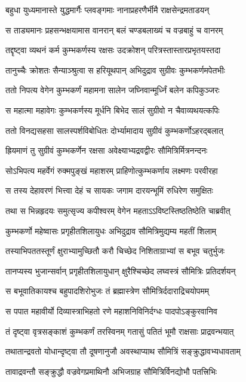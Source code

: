\twolineshloka
{बहुधा युध्यमानास्ते युद्धमार्गैः प्लवङ्गमाः}
{नानाप्रहरणैर्भीमै राक्षसेन्द्रमताडयन्}


\twolineshloka
{स ताड्यमानः प्रहसन्भक्षयामास वानरान्}
{बलं चण्डबलाख्यं च वज्रबाहुं च वानरम्}


\twolineshloka
{तद्दृष्ट्वा व्यथनं कर्म कुम्भकर्णस्य रक्षसः}
{उदक्रोशन् परित्रस्तास्तारप्रभृतयस्तदा}


\twolineshloka
{तानुच्चैः क्रोशतः सैन्याञ्श्रुत्वा स हरियूथपान्}
{अभिदुद्राव सुग्रीवः कुम्भकर्णमपेतभीः}


\twolineshloka
{ततो निपत्य वेगेन कुम्भकर्णं महामना}
{सालेन जघ्निवान्मूर्ध्निं बलेन कपिकुञ्जरः}


\twolineshloka
{स महात्मा महावेगः कुम्भकर्णस्य मूर्धनि}
{बिभेद सालं सुग्रीवो न चैवाव्यथयत्कपिः}


\twolineshloka
{ततो विनद्यसहसा सालस्पर्शविबोधितः}
{दोर्भ्यामादाय सुग्रीवं कुम्भकर्णोऽहरद्बलात्}


\twolineshloka
{ह्रियमाणं तु सुग्रीवं कुम्भकर्णेन रक्षसा}
{अवेक्ष्याभ्यद्रवद्वीरः सौमित्रिर्मित्रनन्दनः}


\twolineshloka
{सोऽभिपत्य महर्वेगं रुक्मपुङ्खं महाशरम्}
{प्राहिणोत्कुम्भकर्णाय लक्ष्मणः परवीरहा}


\twolineshloka
{स तस्य देहावरणं भित्त्वा देहं च सायकः}
{जगाम दारयन्भूमिं रुधिरेण समुक्षितः}


\twolineshloka
{तथा स भिन्नहृदयः समुत्सृज्य कपीश्वरम्}
{वेगेन महताऽऽविष्टस्तिष्ठतिष्ठेति चाब्रवीत्}


\twolineshloka
{कुम्भकर्णो महेष्वासः प्रगृहीतशिलायुधः}
{अभिदुद्राव सौमित्रिमुद्यम्य महतीं शिलाम्}


\twolineshloka
{तस्याभिपततस्तूर्णं क्षुराभ्यामुच्छितौ करौ}
{चिच्छेद निशिताग्राभ्यां स बभूव चतुर्भुजः}


\twolineshloka
{तानप्यस्य भुजान्सर्वान् प्रगृहीतशिलायुधान्}
{क्षुरैश्चिच्छेद लघ्वस्त्रं सौमित्रिः प्रतिदर्शयन्}


\twolineshloka
{स बभूवातिकायश्च बहुपादशिरोभुजः}
{तं ब्रह्मास्त्रेण सौमित्रिर्ददाराद्रिचयोपमम्}


\twolineshloka
{स पपात महावीर्यो दिव्यास्त्राभिहतो रणे}
{महाशनिविनिर्दग्धः पादपोऽङ्कुरवानिव}


\twolineshloka
{तं दृष्ट्वा वृत्रसङ्काशं कुम्भकर्णं तरस्विनम्}
{गतासुं पतितं भूमौ राक्षसाः प्राद्रवन्भयात्}


\twolineshloka
{तथातान्द्रवतो योधान्दृष्ट्वा तौ दूषणानुजौ}
{अवस्थाप्याथ सौमित्रिं सङ्क्रुद्धावभ्यधावताम्}


\twolineshloka
{तावाद्रवन्तौ सङ्क्रुद्धौ वज्रवेगप्रमाथिनौ}
{अभिजग्राह सौमित्रिर्विनद्योभौ पतत्त्रिभिः}


